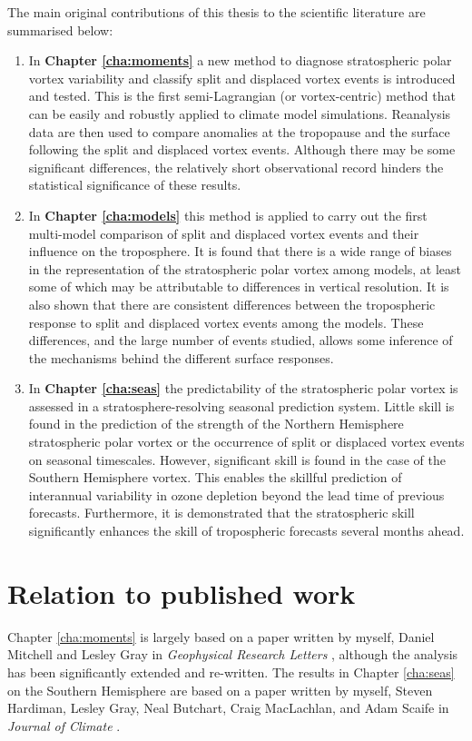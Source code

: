 The main original contributions of this thesis to the scientific literature are
summarised below:
\begin{enumerate}[1.]
\item In \textbf{Chapter \ref{cha:moments}} a new method to diagnose
  stratospheric polar vortex variability and classify split and displaced vortex
  events is introduced and tested. This is the first semi-Lagrangian (or
  vortex-centric) method that can be easily and robustly applied to climate
  model simulations. Reanalysis data are then used to compare anomalies at the
  tropopause and the surface following the split and displaced vortex
  events. Although there may be some significant differences, the relatively
  short observational record hinders the statistical significance of these
  results.

\item In \textbf{Chapter \ref{cha:models}} this method is applied to carry out
  the first multi-model comparison of split and displaced vortex events and
  their influence on the troposphere. It is found that there is a wide range of
  biases in the representation of the stratospheric polar vortex among models,
  at least some of which may be attributable to differences in vertical
  resolution. It is also shown that there are consistent differences between the
  tropospheric response to split and displaced vortex events among the
  models. These differences, and the large number of events studied, allows some
  inference of the mechanisms behind the different surface responses.

\item In \textbf{Chapter \ref{cha:seas}} the predictability of the stratospheric
  polar vortex is assessed in a stratosphere-resolving seasonal prediction
  system. Little skill is found in the prediction of the strength of the
  Northern Hemisphere stratospheric polar vortex or the occurrence of split or
  displaced vortex events on seasonal timescales. However, significant skill is
  found in the case of the Southern Hemisphere vortex. This enables the skillful
  prediction of interannual variability in ozone depletion beyond the lead time
  of previous forecasts. Furthermore, it is demonstrated that the stratospheric
  skill significantly enhances the skill of tropospheric forecasts several
  months ahead.

\end{enumerate}

\section{Relation to published work}
Chapter \ref{cha:moments} is largely based on a paper written by myself, Daniel
Mitchell and Lesley Gray in \emph{Geophysical Research Letters}
\citep{Seviour2013}, although the analysis has been significantly extended and
re-written. The results in Chapter \ref{cha:seas} on the Southern Hemisphere are
based on a paper written by myself, Steven Hardiman, Lesley Gray, Neal Butchart,
Craig MacLachlan, and Adam Scaife in \emph{Journal of Climate}
\citep{Seviour2014}. 

